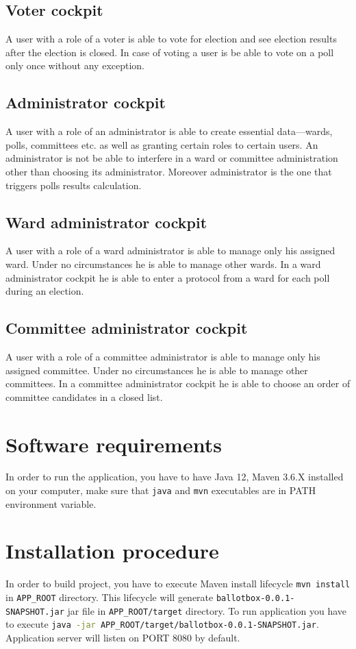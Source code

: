 \documentclass[a4paper,twoside,12pt]{book}
\begin{document}
    \subsection{Voter cockpit}
    A user with a role of a voter is able to vote for election and see election results after the election is closed.
    In case of voting a user is be able to vote on a poll only once without any exception.

    \subsection{Administrator cockpit}
    A user with a role of an administrator is able to create essential data---wards, polls, committees etc. as well as granting certain roles to certain users.
    An administrator is not be able to interfere in a ward or committee administration other than choosing its administrator.
    Moreover administrator is the one that triggers polls results calculation.

    \subsection{Ward administrator cockpit}
    A user with a role of a ward administrator is able to manage only his assigned ward. Under no circumstances he is able to manage other wards.
    In a ward administrator cockpit he is able to enter a  protocol from a ward for each poll during an election.

    \subsection{Committee administrator cockpit}
    A user with a role of a committee administrator is able to manage only his assigned committee. Under no circumstances he is able to manage other committees.
    In a committee administrator cockpit he is able to choose an order of committee candidates in a closed list. 
  
  \section{Software requirements}
    In order to run the application, you have to have Java 12, Maven 3.6.X installed on your computer, 
    make sure that \lstinline[language=bash]|java| and \lstinline[language=bash]|mvn| executables are in PATH environment variable.

  \section{Installation procedure}
    In order to build project, you have to execute Maven install lifecycle \lstinline[language=bash]|mvn install| in \lstinline|APP_ROOT| directory.
    This lifecycle will generate \lstinline[language=bash]|ballotbox-0.0.1-SNAPSHOT.jar| jar file in \lstinline|APP_ROOT/target| directory.
    To run application you have to execute \lstinline[language=bash]|java -jar APP_ROOT/target/ballotbox-0.0.1-SNAPSHOT.jar|. 
    Application server will listen on PORT 8080 by default. 
    
\end{document}
